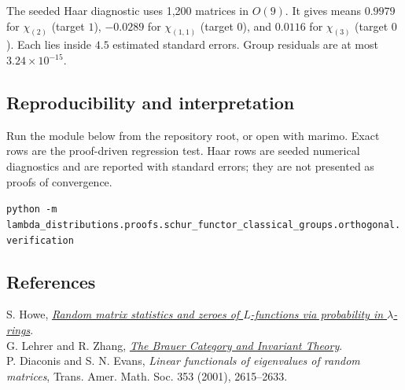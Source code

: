 \documentclass[10pt]{article}
\begin{document}
The seeded Haar diagnostic uses 1,200 matrices in $O(9)$. It gives means $0.9979$ for $\chi_{(2)}$ (target $1$), $-0.0289$ for $\chi_{(1,1)}$ (target $0$), and $0.0116$ for $\chi_{(3)}$ (target $0$). Each lies inside $4.5$ estimated standard errors. Group residuals are at most $3.24\times10^{-15}$.

\subsection{Reproducibility and interpretation}
Run the module below from the repository root, or open  with marimo. Exact rows are the proof-driven regression test. Haar rows are seeded numerical diagnostics and are reported with standard errors; they are not presented as proofs of convergence.
\begin{center}\footnotesize\texttt{python -m lambda\_distributions.proofs.schur\_functor\_classical\_groups.orthogonal.verification}\end{center}

\subsection*{References}
S. Howe, \href{https://arxiv.org/abs/2412.19295}{\emph{Random matrix statistics and zeroes of $L$-functions via probability in $\lambda$-rings}}.\\
G. Lehrer and R. Zhang, \href{https://arxiv.org/abs/1207.5889}{\emph{The Brauer Category and Invariant Theory}}.
\\P. Diaconis and S. N. Evans, \emph{Linear functionals of eigenvalues of
random matrices}, Trans. Amer. Math. Soc. 353 (2001), 2615--2633.
\endgroup


\clearpage
\end{document}
